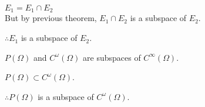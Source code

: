 \documentclass[letterpaper,12pt,fleqn]{article}
\renewcommand{\o}{\omega}
\renewcommand{\O}{\Omega}
\begin{document}
\begin{theproof}
  $E_1=E_1\cap E_2$ \\
  But by previous theorem, $E_1\cap E_2$ is a subspace of $E_2$.

  $\therefore E_1$ is a subspace of $E_2$.
\end{theproof}

\newpage

\begin{example}
  $P(\O)$ and $C^{\o}(\O)$ are subspaces of $C^{\infty}(\O)$.
  
  $P(\O)\subset C^{\o}(\O)$.

  $\therefore P(\O)$ is a subspace of $C^{\o}(\O)$.
\end{example}
\end{document}
